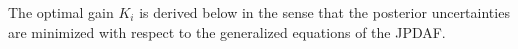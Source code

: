 \documentclass[letterpaper, 10pt, conference]{ieeeconf}
\newcommand{\bracket}[1]{\ensuremath{\left[ #1 \right]}}
\newcommand{\refeqn}[1]{(\ref{eqn:#1})}
\newcommand{\tr}[1]{\mathrm{tr}\ensuremath{\negthickspace\bracket{#1}}}
\begin{document}
%
%
The optimal gain $K_i$ is derived below in the sense that the posterior uncertainties are minimized with respect to the generalized equations of the JPDAF.
\end{document}
